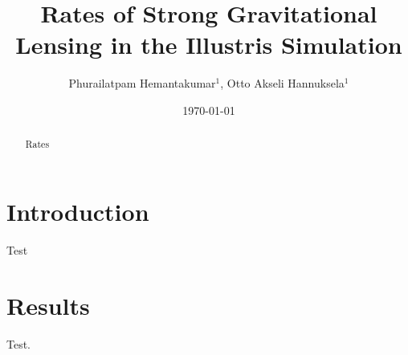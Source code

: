 \documentclass[aps,prd,twocolumn,superscriptaddress,groupedaddress,nofootinbib,showpacs,eqsecnum]{revtex4-1}
\begin{document}

\title{ 
Rates of Strong Gravitational Lensing in the Illustris Simulation
}

\author{Phurailatpam Hemantakumar$^{1}$, Otto Akseli Hannuksela$^{1}$}

\date{\today}
\begin{abstract}
  Rates
\end{abstract}
  
\maketitle

\section{\label{sec:level1}Introduction}

Test 

\newpage

\section{Results}

Test.
\end{document}
